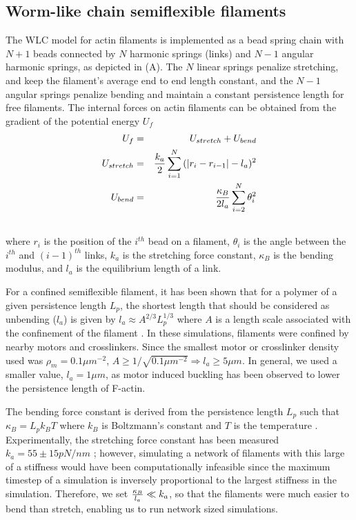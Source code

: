 \documentclass[12pt]{article}
\begin{document}
\subsection{Worm-like chain semiflexible filaments}
The WLC model for actin filaments is implemented as a bead spring chain with $N+1$ beads connected by $N$ harmonic
springs (links) and $N-1$ angular harmonic springs, as depicted in (A). The 
$N$ linear springs penalize stretching, and keep the filament's average end to end length constant, 
and the $N-1$ angular springs penalize bending and maintain a constant persistence length for free filaments. 
The internal forces on actin filaments can be obtained from the gradient of the potential energy $U_f$
\begin{eqnarray}
  U_f &=& U_{stretch} + U_{bend}\\
  U_{stretch}&=&{k_a\over2}\sum_{i=1}^{N}{(|r_i-r_{i-1}| - l_a)^2}\\\nonumber
  U_{bend}&=&{\kappa_B\over 2l_a}\sum_{i=2}^N{\theta_i^2}\\\nonumber
  \label{eqn:Ufil}
\end{eqnarray}
where $r_i$ is the position of the $i^{th}$ bead on a filament, 
$\theta_i$ is the angle between the $i^{th}$ and $(i-1)^{th}$ links, 
$k_a$ is the
stretching force constant, $\kappa_B$ is the bending modulus, and $l_a$ is the equilibrium length of a
link. 
\par
For a confined semiflexible filament, it has been shown that for a polymer of a
given persistence length $L_p$, the shortest length that should be considered as
unbending ($l_a$) is given by $l_a\approx A^{2/3}L_p^{1/3}$ where $A$ is a
length scale associated with the confinement of the
filament \cite{odijk1983}. In these simulations, filaments were confined by
nearby motors and crosslinkers. Since the smallest motor or crosslinker density
used was $\rho_m=0.1\mu m^{-2}$, $A\ge1/\sqrt{0.1\mu m^{-2}}\Rightarrow l_a\ge5\mu m$.
In general, we used a smaller value, $l_a=1\mu m$, as motor induced buckling has been
observed to lower the persistence length of F-actin. 
\par
The bending force constant is derived from the persistence length $L_p$ such that
$\kappa_B = L_p k_B T$ where $k_B$ is Boltzmann's constant and $T$ is the temperature \cite{rubinstein}.
Experimentally, the stretching force constant has been measured $k_a=55\pm15 pN/nm$ \cite{kojima1994, higuchi1995};
however, simulating a network of filaments with this large of a stiffness would
have been computationally infeasible since the maximum timestep of a simulation is inversely
proportional to the largest stiffness in the simulation\cite{leimkuhler2015}. Therefore, we set
${\kappa_B\over l_a} \ll k_a$, so that the filaments
were much easier to bend than stretch, enabling us to run network sized 
simulations.
\end{document}
